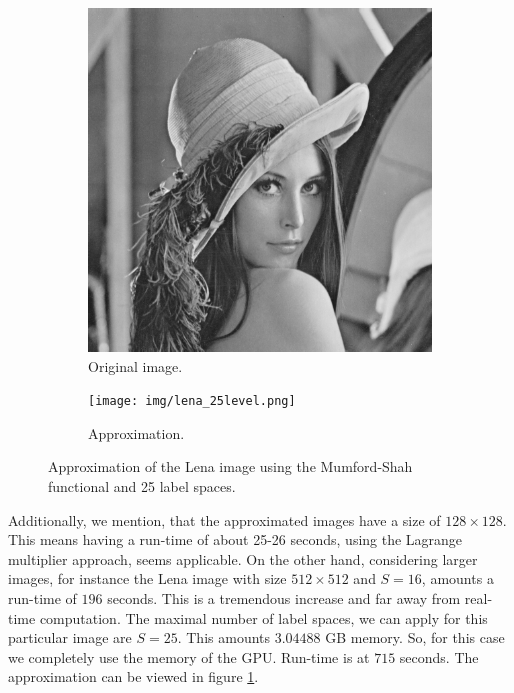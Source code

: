 \documentclass{scrreprt}
\begin{document}
            \begin{figure}[!ht]
                \centering
                \begin{subfigure}[b]{0.3\textwidth}
                    \includegraphics[width=\textwidth]{img/images/lena.png}
                    \caption{Original image.}
                \end{subfigure}
                \begin{subfigure}[b]{0.3\textwidth}
                    \texttt{[image: img/lena\_25level.png]}
                    \caption{Approximation.}
                \end{subfigure}
                \caption[Mumford-Shah approximation of Lena using 25 level.]{Approximation of the Lena image using the Mumford-Shah functional and 25 label spaces.}
            \label{fig:lena_ms}
            \end{figure}

            Additionally, we mention, that the approximated images have a size of $128 \times 128$. This means having a run-time of about 25-26 seconds, using the Lagrange multiplier approach, seems applicable. On the other hand, considering larger images, for instance the Lena image with size $512 \times 512$ and $S = 16$, amounts a run-time of $196$ seconds. This is a tremendous increase and far away from real-time computation. The maximal number of label spaces, we can apply for this particular image are $S = 25$. This amounts $3.04488$ GB memory. So, for this case we completely use the memory of the GPU. Run-time is at $715$ seconds. The approximation can be viewed in figure \ref{fig:lena_ms}.
\end{document}
